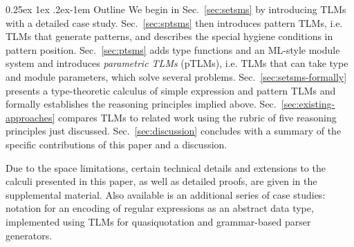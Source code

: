 \documentclass[acmsmall,review,anonymous]{acmart}\settopmatter{printfolios=true,printccs=false,printacmref=false}
\makeatletter
\renewcommand{\paragraph}{%
  \@startsection{paragraph}{4}%
  {\z@}{0.25ex \@plus 1ex \@minus .2ex}{-1em}%
  {\normalfont\normalsize\bfseries}%
}
\makeatother
\begin{document}
\paragraph{Outline} 
We begin in Sec.~\ref{sec:setsms} by introducing TLMs with a detailed case study. 
Sec.~\ref{sec:sptsms} then introduces {pattern TLMs}, i.e. TLMs that generate patterns, and describes the special hygiene conditions in pattern position. %
Sec.~\ref{sec:ptsms} adds type functions and an ML-style module system and introduces \emph{parametric TLMs} (pTLMs), i.e. TLMs that can take type and module parameters, which solve several problems. 
Sec.~\ref{sec:setsms-formally} presents a type-theoretic calculus of simple expression and pattern TLMs and formally establishes the reasoning principles implied above. 
Sec.~\ref{sec:existing-approaches} compares TLMs to related work using the rubric of five reasoning principles just discussed. 
Sec.~\ref{sec:discussion} concludes with a summary of the specific contributions of this paper and a discussion.



Due to the space limitations, certain technical details and extensions to the calculi presented in this paper, as well as detailed proofs, are given in the supplemental material. Also available is an additional series of case studies: notation for an encoding of regular expressions as an abstract data type, implemented using TLMs for quasiquotation and grammar-based parser generators. %
\end{document}
